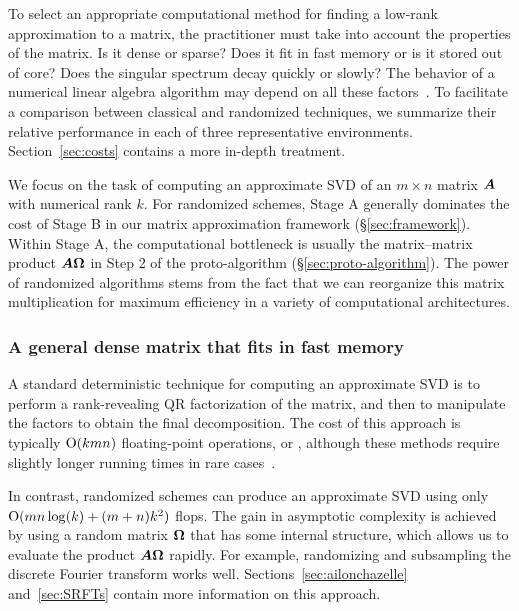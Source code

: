 \documentclass[final]{siamltex}
\newcounter{algorithm}[section]
\begin{document}
To select an appropriate computational method for finding a low-rank
approximation to a matrix, the practitioner must take into account
the properties of the matrix.  Is it dense or sparse?  Does it fit
in fast memory or is it stored out of core?  Does the singular spectrum
decay quickly or slowly?
The behavior of a numerical linear algebra algorithm may depend on
all these factors~\cite{Bjo96:Numerical-Methods,golub,trefethen_bau}.
To facilitate a comparison between classical
and randomized techniques, we summarize their relative performance
in each of three representative environments.
Section~\ref{sec:costs} contains a more in-depth treatment.

We focus on the task of computing an approximate SVD
of an $m \times n$ matrix $\bm{A}$ with numerical rank $k$.
For randomized schemes, Stage A generally dominates the cost of Stage B
in our matrix approximation framework (\S\ref{sec:framework}).
Within Stage A, the computational bottleneck is usually the
matrix--matrix product $\bm{A\Omega}$ in Step 2 of the
proto-algorithm (\S\ref{sec:proto-algorithm}).
The power of randomized algorithms stems from the fact that
we can reorganize this matrix multiplication for maximum
efficiency in a variety of computational architectures.

\subsubsection{A general dense matrix that fits in fast memory}
\label{sec:intro_fits in RAM}

A standard deterministic technique for computing an approximate SVD is to
perform a rank-revealing QR factorization of the matrix,
and then to manipulate the factors to obtain the final decomposition.
The cost of this approach is typically $\mathrm{O}(kmn)$ floating-point
operations, or , although these methods require slightly
longer running times in rare cases~\cite{gu_rrqr}.

In contrast, randomized schemes can produce an approximate SVD using
only $\mathrm{O}(mn\log(k) + (m+n)k^2)$ flops.  The gain in asymptotic
complexity is achieved by using a random matrix $\bm{\Omega}$ that
has some internal structure, which allows us to evaluate the
product $\bm{A\Omega}$ rapidly.  For example,
randomizing and subsampling the discrete Fourier transform
works well.  Sections~\ref{sec:ailonchazelle} and~\ref{sec:SRFTs}
contain more information on this approach.
\end{document}
